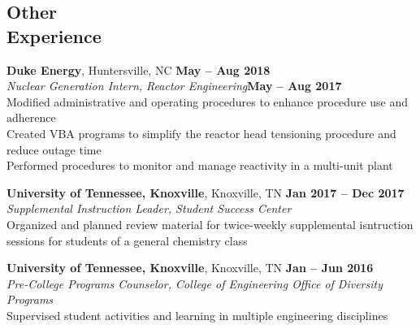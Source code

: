 \documentclass[margin,line]{resume}
\begin{document}
\begin{resume}
    \section{\mysidestyle Other\\Experience}
    \textbf{Duke Energy}, Huntersville, NC \hfill \textbf{May -- Aug 2018}\\
                \textsl{Nuclear Generation Intern, Reactor Engineering}\hfill \textbf{May -- Aug 2017}\\
                Modified administrative and operating procedures to enhance procedure use and adherence \\
                Created VBA programs to simplify the reactor head tensioning procedure and reduce outage time \\
                Performed procedures to monitor and manage reactivity in a multi-unit plant 

    \textbf{University of Tennessee, Knoxville}, Knoxville, TN \hfill \textbf{Jan 2017 -- Dec 2017}\\
                \textsl{Supplemental Instruction Leader, Student Success Center}\\
                Organized and planned review material for twice-weekly supplemental isntruction sessions 
                for students of a general chemistry class
                
    \textbf{University of Tennessee, Knoxville}, Knoxville, TN \hfill \textbf{Jan -- Jun 2016}\\
                \textsl{Pre-College Programs Counselor, College of Engineering Office of Diversity Programs}\\
                Supervised student activities and learning in multiple engineering disciplines

\end{resume}
\end{document}
